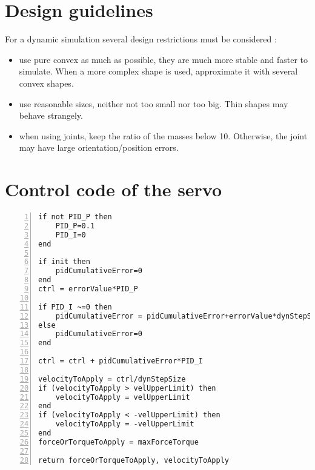 \chapter{Design guidelines}
For a dynamic simulation several design restrictions must be considered : \begin{itemize}
\item use pure convex as much as possible, they are much more stable and faster to simulate. When a more complex shape is used, approximate it with several convex shapes.

\item use reasonable sizes, neither not too small nor too big. Thin shapes may behave strangely.

\item when using joints, keep the ratio of the masses below 10. Otherwise, the joint may have large orientation/position errors.
\end{itemize}

\chapter{Control code of the servo}
\begin{lstlisting}[language={[5.0]Lua}, numbers = left, tabsize = 4, frame=single,breaklines, keywordstyle=\color{blue}, float, label={lst:servo}, captionpos = b]
if not PID_P then
    PID_P=0.1
    PID_I=0
end

if init then
    pidCumulativeError=0
end
ctrl = errorValue*PID_P

if PID_I ~=0 then
    pidCumulativeError = pidCumulativeError+errorValue*dynStepSize
else
    pidCumulativeError=0
end

ctrl = ctrl + pidCumulativeError*PID_I

velocityToApply = ctrl/dynStepSize
if (velocityToApply > velUpperLimit) then
    velocityToApply = velUpperLimit
end
if (velocityToApply < -velUpperLimit) then
    velocityToApply = -velUpperLimit
end
forceOrTorqueToApply = maxForceTorque

return forceOrTorqueToApply, velocityToApply
\end{lstlisting}
